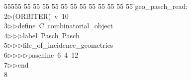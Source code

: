 %
%
\begin{tabbing}
55555 \= 55 \= 55 \= 55 \= 55 \= 55 \= 55 \= 55 \= 55 \= 55 \= 55 \= 55 \= 55 \= \>geo\_pasch\_read:\\[0pt]
2\>$\triangleright$\>(ORBITER)\ v\ 10\ \\[0pt]
3\>$\triangleright$\>$\triangleright$\>define\ C\ combinatorial\_object\ \\[0pt]
4\>$\triangleright$\>$\triangleright$\>$\triangleright$\>label\ Pasch\ Pasch\ \\[0pt]
5\>$\triangleright$\>$\triangleright$\>$\triangleright$\>file\_of\_incidence\_geometries\ \\[0pt]
6\>$\triangleright$\>$\triangleright$\>$\triangleright$\>$\triangleright$\>paschinc\ 6\ 4\ 12\ \\[0pt]
7\>$\triangleright$\>$\triangleright$\>end\\[0pt]
8\>\end{tabbing}
